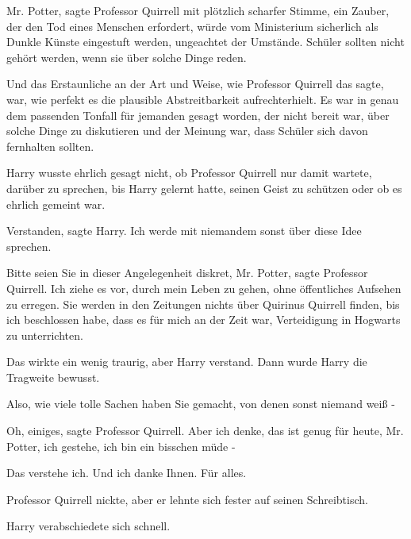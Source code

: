 \glqq{}Mr. Potter\grqq{}, sagte Professor Quirrell mit plötzlich scharfer Stimme,
\glqq{}ein Zauber, der den Tod eines Menschen erfordert, würde vom Ministerium
sicherlich als Dunkle Künste eingestuft werden, ungeachtet der Umstände. Schüler
sollten nicht gehört werden, wenn sie über solche Dinge reden.\grqq{}

Und das Erstaunliche an der Art und Weise, wie Professor Quirrell das sagte,
war, wie perfekt es die plausible Abstreitbarkeit aufrechterhielt. Es war in
genau dem passenden Tonfall für jemanden gesagt worden, der nicht bereit war,
über solche Dinge zu diskutieren und der Meinung war, dass Schüler sich davon
fernhalten sollten.

Harry wusste ehrlich gesagt nicht, ob Professor Quirrell nur damit wartete,
darüber zu sprechen, bis Harry gelernt hatte, seinen Geist zu schützen oder ob
es ehrlich gemeint war.

\glqq{}Verstanden\grqq{}, sagte Harry. \glqq{}Ich werde mit niemandem sonst über
diese Idee sprechen.\grqq{}

\glqq{}Bitte seien Sie in dieser Angelegenheit diskret, Mr. Potter\grqq{}, sagte
Professor Quirrell. \glqq{}Ich ziehe es vor, durch mein Leben zu gehen, ohne
öffentliches Aufsehen zu erregen. Sie werden in den Zeitungen nichts über
Quirinus Quirrell finden, bis ich beschlossen habe, dass es für mich an der Zeit
war, Verteidigung in Hogwarts zu unterrichten.\grqq{}

Das wirkte ein wenig traurig, aber Harry verstand. Dann wurde Harry die
Tragweite bewusst.

\glqq{}Also, wie viele tolle Sachen haben Sie gemacht, von denen sonst niemand
weiß -\grqq{}

\glqq{}Oh, einiges\grqq{}, sagte Professor Quirrell. \glqq{}Aber ich denke, das
ist genug für heute, Mr. Potter, ich gestehe, ich bin ein bisschen müde -\grqq{}

\glqq{}Das verstehe ich. Und ich danke Ihnen. Für alles.\grqq{}

Professor Quirrell nickte, aber er lehnte sich fester auf seinen Schreibtisch.

Harry verabschiedete sich schnell.

